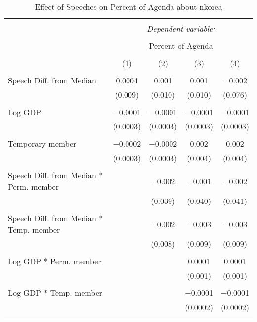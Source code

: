 
\begin{table}[!htbp] \centering 
  \caption{Effect of Speeches on Percent of Agenda about nkorea} 
  \label{} 
\begin{tabular}{@{\extracolsep{5pt}}lcccc} 
\\[-1.8ex]\hline 
\hline \\[-1.8ex] 
 & \multicolumn{4}{c}{\textit{Dependent variable:}} \\ 
\cline{2-5} 
\\[-1.8ex] & \multicolumn{4}{c}{Percent of Agenda} \\ 
\\[-1.8ex] & (1) & (2) & (3) & (4)\\ 
\hline \\[-1.8ex] 
 Speech Diff. from Median & 0.0004 & 0.001 & 0.001 & $-$0.002 \\ 
  & (0.009) & (0.010) & (0.010) & (0.076) \\ 
  & & & & \\ 
 Log GDP & $-$0.0001 & $-$0.0001 & $-$0.0001 & $-$0.0001 \\ 
  & (0.0003) & (0.0003) & (0.0003) & (0.0003) \\ 
  & & & & \\ 
 Temporary member & $-$0.0002 & $-$0.0002 & 0.002 & 0.002 \\ 
  & (0.0003) & (0.0003) & (0.004) & (0.004) \\ 
  & & & & \\ 
 Speech Diff. from Median * Perm. member &  & $-$0.002 & $-$0.001 & $-$0.002 \\ 
  &  & (0.039) & (0.040) & (0.041) \\ 
  & & & & \\ 
 Speech Diff. from Median * Temp. member &  & $-$0.002 & $-$0.003 & $-$0.003 \\ 
  &  & (0.008) & (0.009) & (0.009) \\ 
  & & & & \\ 
 Log GDP * Perm. member &  &  & 0.0001 & 0.0001 \\ 
  &  &  & (0.001) & (0.001) \\ 
  & & & & \\ 
 Log GDP * Temp. member &  &  & $-$0.0001 & $-$0.0001 \\ 
  &  &  & (0.0002) & (0.0002) \\ 
  & & & & \\ 

\end{tabular}
\end{table}
